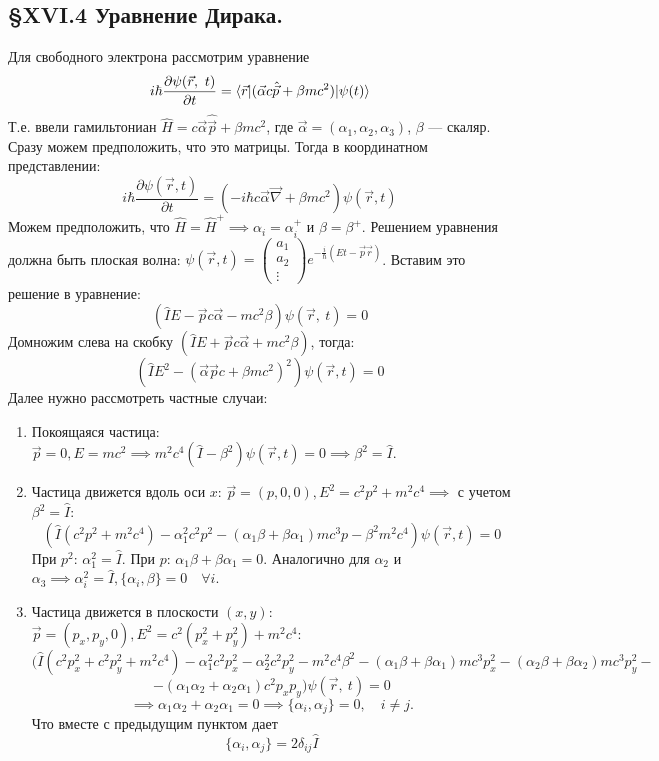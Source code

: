 \subsection{\S XVI.4 Уравнение Дирака.}
Для свободного электрона рассмотрим уравнение
\[
i\hbar \dfrac{\partial \psi(\vec{r},~t)}{\partial t} = \langle \vec{r} | (\vec{\alpha} c\hat{\vec{p}} + \beta mc^2) | \psi(t) \rangle
\]
Т.е. ввели гамильтониан $\hat{H} = c \vec{\alpha} \hat{\vec{p}} + \beta mc^2$, где $\vec{\alpha} = (\alpha_1, \alpha_2, \alpha_3)$, $\beta$ --- скаляр. Сразу можем предположить, что это матрицы. Тогда в координатном представлении:
\[
i\hbar \dfrac{\partial \psi(\vec{r}, t)}{\partial t} = (-i\hbar c \vec{\alpha} \vec{\nabla} + \beta mc^2) \psi(\vec{r}, t)
\]
Можем предположить, что $\hat{H} = \hat{H}^+ \implies \alpha_i = \alpha_i^+$ и $\beta = \beta^+$.
Решением уравнения должна быть плоская волна: $\psi(\vec{r}, t) = \begin{pmatrix} a_1 \\ a_2 \\ \vdots \end{pmatrix} e^{-\frac{i}{\hbar}(Et - \vec{p}\vec{r})}$. Вставим это решение в уравнение:
\[
(\hat{I}E - \vec{p}c\vec{\alpha} - mc^2\beta)\psi(\vec{r},~t) = 0
\]
Домножим слева на скобку $(\hat{I}E + \vec{p}c\vec{\alpha} + mc^2\beta)$, тогда:
\[
(\hat{I}E^2 - (\vec{\alpha} \vec{p}c + \beta mc^2)^2) \psi(\vec{r}, t) = 0
\]
Далее нужно рассмотреть частные случаи:
\begin{enumerate}
	\item Покоящаяся частица: $\vec{p} = 0, E = mc^2 \implies m^2c^4(\hat{I} - \beta^2) \psi(\vec{r}, t) = 0 \implies \beta^2 = \hat{I}$.
	\item Частица движется вдоль оси $x$: $\vec{p} = (p, 0, 0), E^2 = c^2p^2 + m^2c^4 \implies$ с учетом $\beta^2 = \hat{I}$:
	\[
	(\hat{I}(c^2p^2 + m^2c^4) - \alpha_1^2 c^2p^2 - (\alpha_1 \beta + \beta \alpha_1)mc^3 p - \beta^2 m^2c^4) \psi(\vec{r}, t) = 0
	\]
	При $p^2$: $\alpha_1^2 = \hat{I}$. При $p$: $\alpha_1 \beta + \beta \alpha_1 = 0$.
	Аналогично для $\alpha_2$ и $\alpha_3 \implies \alpha_i^2 = \hat{I}, \{ \alpha_i, \beta \} = 0 \quad \forall i$.
	\item Частица движется в плоскости $(x, y)$: $\vec{p} = (p_x, p_y, 0), E^2 = c^2(p_x^2 + p_y^2) + m^2c^4$:
	\[
	(\hat{I}(c^2p_x^2+c^2p_y^2+m^2c^4)-\alpha_1^2c^2p_x^2-\alpha_2^2c^2p_y^2-m^2c^4\beta^2 - (\alpha_1\beta+\beta\alpha_1)mc^3p_x^2 - (\alpha_2\beta+\beta\alpha_2)mc^3p_y^2-
	\]
	\[
	-(\alpha_1\alpha_2 + \alpha_2\alpha_1)c^2p_xp_y)\psi(\vec{r},~t) = 0
	\]
	\[
	\implies \alpha_1 \alpha_2 + \alpha_2 \alpha_1 = 0 \implies \{ \alpha_i, \alpha_j \} = 0, \quad i \neq j.
	\]
	Что вместе с предыдущим пунктом дает
	\[
	\{ \alpha_i, \alpha_j \} = 2\delta_{ij}\hat{I}
	\]
\end{enumerate}

